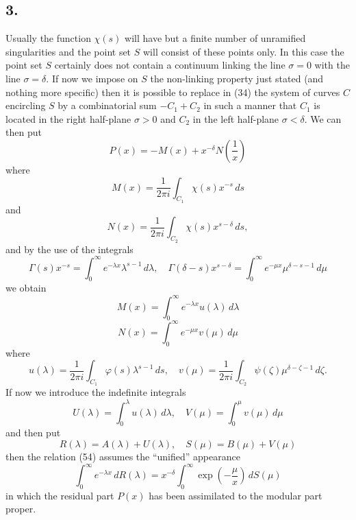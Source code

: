 \documentclass[12pt]{article}
\begin{document}
\subsection*{3.}

Usually the function \(\chi(s)\) will have but a finite number of unramified singularities and the point set \(S\) will consist of these points only. In this case the point set \(S\) certainly does not contain a continuum linking the line \(\sigma = 0\) with the line \(\sigma = \delta\). If now we impose on \(S\) the non-linking property just stated (and nothing more specific) then it is possible to replace in (34) the system of curves \(C\) encircling \(S\) by a combinatorial sum \(-C_1 + C_2\) in such a manner that \(C_1\) is located in the right half-plane \(\sigma > 0\) and \(C_2\) in the left half-plane \(\sigma < \delta\). We can then put
\begin{equation}
P(x) = -M(x) + x^{-\delta} N\left( \frac{1}{x} \right)
\tag{61}
\end{equation}
where
\begin{equation}
M(x) = \frac{1}{2\pi i} \int_{C_1} \chi(s) x^{-s} \, ds
\tag{62}
\end{equation}
and
\begin{equation}
N(x) = \frac{1}{2\pi i} \int_{C_2} \chi(s) x^{s-\delta} \, ds,
\tag{63}
\end{equation}
and by the use of the integrals
\[
\Gamma(s)x^{-s} = \int_{0}^{\infty} e^{-\lambda x} \lambda^{s-1} \, d\lambda, \quad \Gamma(\delta - s)x^{s-\delta} = \int_{0}^{\infty} e^{-\mu x} \mu^{\delta-s-1} \, d\mu
\]
we obtain
\begin{equation}
M(x) = \int_{0}^{\infty} e^{-\lambda x} u(\lambda) \, d\lambda
\tag{64}
\end{equation}
\begin{equation}
N(x) = \int_{0}^{\infty} e^{-\mu x} v(\mu) \, d\mu
\tag{65}
\end{equation}
where
\begin{equation}
u(\lambda) = \frac{1}{2\pi i} \int_{C_1} \varphi(s) \lambda^{s-1} \, ds, \quad v(\mu) = \frac{1}{2\pi i} \int_{C_2} \psi(\zeta) \mu^{\delta-\zeta-1} \, d\zeta.
\tag{66}
\end{equation}
If now we introduce the indefinite integrals
\begin{equation}
U(\lambda) = \int_{0}^{\lambda} u(\lambda) \, d\lambda, \quad V(\mu) = \int_{0}^{\mu} v(\mu) \, d\mu
\tag{67}
\end{equation}
and then put
\begin{equation}
R(\lambda) = A(\lambda) + U(\lambda), \quad S(\mu) = B(\mu) + V(\mu)
\tag{68}
\end{equation}
then the relation (54) assumes the ``unified'' appearance
\begin{equation}
\int_{0}^{\infty} e^{-\lambda x} \, dR(\lambda) = x^{-\delta} \int_{0}^{\infty} \exp \left( -\frac{\mu}{x} \right) \, dS(\mu)
\tag{69}
\end{equation}
in which the residual part \(P(x)\) has been assimilated to the modular part proper.
\end{document}
